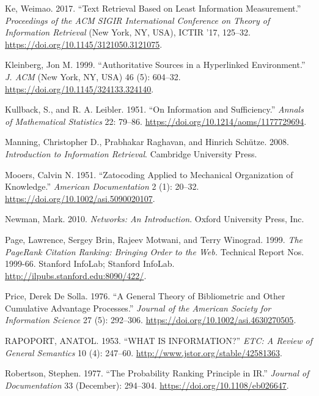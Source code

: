 \documentclass[
  letterpaper,
]{scrbook}
\newlength{\cslhangindent}
\newenvironment{CSLReferences}[2] %
 {\begin{list}{}{%
  \setlength{\itemindent}{0pt}
  \setlength{\leftmargin}{0pt}
  \setlength{\parsep}{0pt}
  \ifodd #1
   \setlength{\leftmargin}{\cslhangindent}
   \setlength{\itemindent}{-1\cslhangindent}
  \fi
  \setlength{\itemsep}{#2\baselineskip}}}
 {\end{list}}
\begin{document}
\begin{CSLReferences}{1}{1}
Ke, Weimao. 2017. {``Text Retrieval Based on Least Information
Measurement.''} \emph{Proceedings of the ACM SIGIR International
Conference on Theory of Information Retrieval} (New York, NY, USA),
ICTIR '17, 125--32. \url{https://doi.org/10.1145/3121050.3121075}.

Kleinberg, Jon M. 1999. {``Authoritative Sources in a Hyperlinked
Environment.''} \emph{J. ACM} (New York, NY, USA) 46 (5): 604--32.
\url{https://doi.org/10.1145/324133.324140}.

Kullback, S., and R. A. Leibler. 1951. {``On Information and
Sufficiency.''} \emph{Annals of Mathematical Statistics} 22: 79--86.
\url{https://doi.org/10.1214/aoms/1177729694}.

Manning, Christopher D., Prabhakar Raghavan, and Hinrich Schütze. 2008.
\emph{Introduction to Information Retrieval}. Cambridge University
Press.

Mooers, Calvin N. 1951. {``Zatocoding Applied to Mechanical Organization
of Knowledge.''} \emph{American Documentation} 2 (1): 20--32.
\url{https://doi.org/10.1002/asi.5090020107}.

Newman, Mark. 2010. \emph{Networks: An Introduction}. Oxford University
Press, Inc.

Page, Lawrence, Sergey Brin, Rajeev Motwani, and Terry Winograd. 1999.
\emph{The PageRank Citation Ranking: Bringing Order to the Web.}
Technical Report Nos. 1999-66. Stanford InfoLab; Stanford InfoLab.
\url{http://ilpubs.stanford.edu:8090/422/}.

Price, Derek De Solla. 1976. {``A General Theory of Bibliometric and
Other Cumulative Advantage Processes.''} \emph{Journal of the American
Society for Information Science} 27 (5): 292--306.
\url{https://doi.org/10.1002/asi.4630270505}.

RAPOPORT, ANATOL. 1953. {``WHAT IS INFORMATION?''} \emph{ETC: A Review
of General Semantics} 10 (4): 247--60.
\url{http://www.jstor.org/stable/42581363}.

Robertson, Stephen. 1977. {``The Probability Ranking Principle in
{IR}.''} \emph{Journal of Documentation} 33 (December): 294--304.
\url{https://doi.org/10.1108/eb026647}.


\end{CSLReferences}
\end{document}
